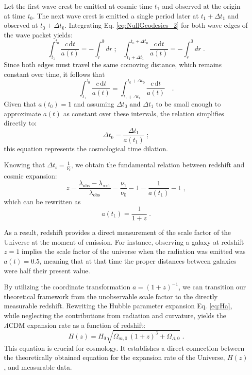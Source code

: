 \documentclass[12pt,a4paper,oneside]{report}
\begin{document}
Let the first wave crest be emitted at cosmic time $t_1$ and observed at the origin at time $t_0$. The next wave crest is emitted a single period later at $t_1 + \Delta t_1$ and observed at $t_0 + \Delta t_0$. Integrating Eq. \eqref{eq:NullGeodesics_2} for both wave edges of the wave packet yields:
\begin{equation}
  \int_{t_1}^{t_0} \frac{c \, \mathrm{d}t}{a(t)} = - \int_{r}^{0} dr \; \text{;} \quad \int_{t_1 + \Delta t_1}^{t_0 + \Delta t_0} \frac{c \, \mathrm{d}t}{a(t)} = - \int_{r}^{0} dr \; .
  \label{eq:WavePackets}
\end{equation}
Since both edges must travel the same comoving distance, which remains constant over time, it follows that
\begin{equation}
  \int_{t_1}^{t_0} \frac{c \, \mathrm{d}t}{a(t)} = \int_{t_1 + \Delta t_1}^{t_0 + \Delta t_0} \frac{c \, \mathrm{d}t}{a(t)} \quad .
  \label{eq:WavePackets_Equality}
\end{equation}
Given that $a(t_0) = 1$ and assuming $\Delta t_0$ and $\Delta t_1$ to be small enough to approximate $a(t)$ as constant over these
intervals, the relation simplifies directly to:
\begin{equation}
  \Delta t_0 = \frac{\Delta t_1}{a(t_1)} \; ;
  \label{eq:TimeDilation}
\end{equation}
this equation represents the cosmological time dilation.

Knowing that $\Delta t_i = \frac{1}{\nu_i}$, we obtain the fundamental relation between redshift and cosmic expansion:
\begin{equation}
  z = \frac{\lambda_\mathrm{obs} - \lambda_\mathrm{rest}}{\lambda_\mathrm{obs}} = \frac{\nu_1}{\nu_0} - 1 = \frac{1}{a(t_1)} - 1 \; ,
  \label{eq:Redshift_Equality}
\end{equation}
which can be rewritten as
\begin{equation}
  a(t_1) = \frac{1}{1 + z} \; .
  \label{eq:ScaleFactor_Redshift}
\end{equation}

As a result, redshift provides a direct measurement of the scale factor of the Universe at the moment of emission. For instance, observing a galaxy at redshift $z = 1$ implies the scale factor of the universe when the radiation was emitted was $a(t) = 0.5$, meaning that at that time the proper distances between galaxies were half their present value.

By utilizing the coordinate transformation $a = (1 + z)^{-1}$, we can transition our theoretical framework from the unobservable scale factor to the directly measurable redshift. Rewriting the Hubble parameter expansion Eq. \eqref{eq:Ha}, while neglecting the contributions from radiation and curvature, yields the $\Lambda \mathrm{CDM}$ expansion rate as a function of redshift:
\begin{equation}
  H(z) = H_0 \sqrt{\Omega_{m,0} \, (1 + z)^3 + \Omega_{\Lambda,0}} \; .
  \label{eq:HubbleParameter}
\end{equation}
This equation is crucial for cosmology. It establishes a direct connection between the theoretically obtained equation for the expansion rate of the Universe, $H(z)$, and measurable data.
\end{document}
